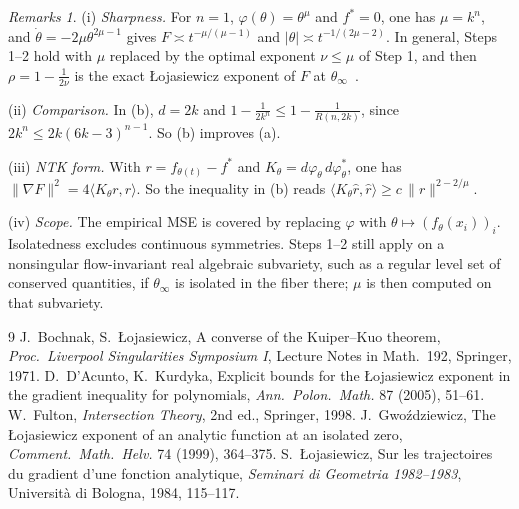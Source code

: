 \documentclass[11pt]{article}
\theoremstyle{remark}
\newtheorem*{remarks}{Remarks}
\begin{document}
\begin{remarks}
(i) \emph{Sharpness.} For $n=1$, $\varphi(\theta)=\theta^\mu$ and $f^*=0$, one has $\mu=k^n$, and $\dot\theta=-2\mu\theta^{2\mu-1}$ gives $F\asymp t^{-\mu/(\mu-1)}$ and $|\theta|\asymp t^{-1/(2\mu-2)}$. In general, Steps 1--2 hold with $\mu$ replaced by the optimal exponent $\nu\le\mu$ of Step 1, and then $\rho=1-\frac1{2\nu}$ is the exact {\L}ojasiewicz exponent of $F$ at $\theta_\infty$~\cite{Gwo99}.

(ii) \emph{Comparison.} In (b), $d=2k$ and $1-\frac1{2k^n}\le1-\frac1{R(n,2k)}$, since $2k^n\le2k(6k-3)^{n-1}$. So (b) improves (a).

(iii) \emph{NTK form.} With $r=f_{\theta(t)}-f^*$ and $K_\theta=d\varphi_\theta\,d\varphi_\theta^*$, one has $\|\nabla F\|^2=4\langle K_\theta r,r\rangle$. So the inequality in (b) reads $\langle K_\theta\hat r,\hat r\rangle\ge c\,\|r\|^{2-2/\mu}$.

(iv) \emph{Scope.} The empirical MSE is covered by replacing $\varphi$ with $\theta\mapsto(f_\theta(x_i))_i$. Isolatedness excludes continuous symmetries. Steps 1--2 still apply on a nonsingular flow-invariant real algebraic subvariety, such as a regular level set of conserved quantities, if $\theta_\infty$ is isolated in the fiber there; $\mu$ is then computed on that subvariety.
\end{remarks}

\begin{thebibliography}{9}
 J.~Bochnak, S.~{\L}ojasiewicz, A converse of the Kuiper--Kuo theorem, \emph{Proc.\ Liverpool Singularities Symposium I}, Lecture Notes in Math.\ 192, Springer, 1971.
 D.~D'Acunto, K.~Kurdyka, Explicit bounds for the {\L}ojasiewicz exponent in the gradient inequality for polynomials, \emph{Ann.\ Polon.\ Math.} 87 (2005), 51--61.
 W.~Fulton, \emph{Intersection Theory}, 2nd ed., Springer, 1998.
 J.~Gwo\'zdziewicz, The {\L}ojasiewicz exponent of an analytic function at an isolated zero, \emph{Comment.\ Math.\ Helv.} 74 (1999), 364--375.
 S.~{\L}ojasiewicz, Sur les trajectoires du gradient d'une fonction analytique, \emph{Seminari di Geometria 1982--1983}, Universit\`a di Bologna, 1984, 115--117.
\end{thebibliography}
\end{document}
